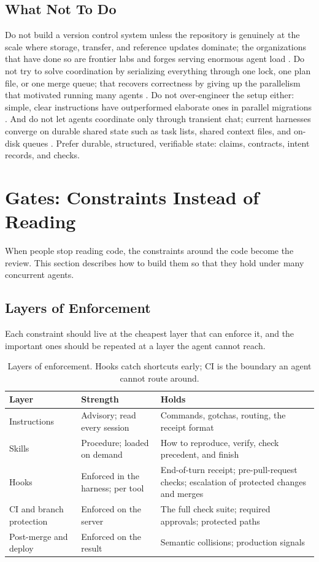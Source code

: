 \documentclass[11pt]{article}
\begin{document}
\subsection{What Not To Do}
Do not build a version control system unless the repository is genuinely at the scale where storage, transfer, and reference updates dominate; the organizations that have done so are frontier labs and forges serving enormous agent load \cite{anthropic2026scion,celenza2026gitinfra,marti2026gitscale}. Do not try to solve coordination by serializing everything through one lock, one plan file, or one merge queue; that recovers correctness by giving up the parallelism that motivated running many agents \cite{nikolaev2026claimplane}. Do not over-engineer the setup either: simple, clear instructions have outperformed elaborate ones in parallel migrations \cite{openai2026asana}. And do not let agents coordinate only through transient chat; current harnesses converge on durable shared state such as task lists, shared context files, and on-disk queues \cite{anthropic2026agentteams,cursor2026projects,anthropic2026migrations}. Prefer durable, structured, verifiable state: claims, contracts, intent records, and checks.

\section{Gates: Constraints Instead of Reading}
\label{sec:gates}
When people stop reading code, the constraints around the code become the review. This section describes how to build them so that they hold under many concurrent agents.

\subsection{Layers of Enforcement}
Each constraint should live at the cheapest layer that can enforce it, and the important ones should be repeated at a layer the agent cannot reach.

\begin{table}[h]
\centering
\small
\begin{tabularx}{\textwidth}{l L L}
\toprule
Layer & Strength & Holds \\
\midrule
Instructions & Advisory; read every session & Commands, gotchas, routing, the receipt format \\
Skills & Procedure; loaded on demand & How to reproduce, verify, check precedent, and finish \\
Hooks & Enforced in the harness; per tool & End-of-turn receipt; pre-pull-request checks; escalation of protected changes and merges \\
CI and branch protection & Enforced on the server & The full check suite; required approvals; protected paths \\
Post-merge and deploy & Enforced on the result & Semantic collisions; production signals \\
\bottomrule
\end{tabularx}
\caption{Layers of enforcement. Hooks catch shortcuts early; CI is the boundary an agent cannot route around.}
\end{table}
\end{document}
